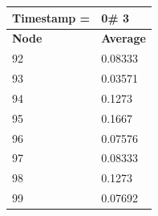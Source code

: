 \begin{tabular}{|l||l|}
\hline
\textbf{Timestamp =} & \textbf{0}\# 3\\\hline
	\textbf{Node} & \textbf{Average} \\ \hline
\hline
	92 & 0.08333 \\ \hline
	93 & 0.03571 \\ \hline
	94 & 0.1273 \\ \hline
	95 & 0.1667 \\ \hline
	96 & 0.07576 \\ \hline
	97 & 0.08333 \\ \hline
	98 & 0.1273 \\ \hline
	99 & 0.07692 \\ \hline
\end{tabular}

